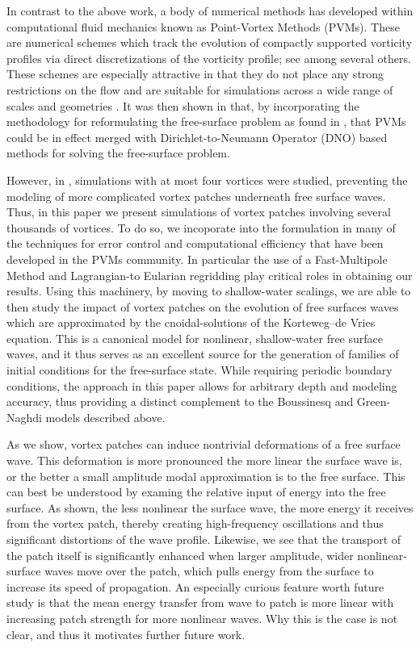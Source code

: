 \documentclass[a4paper,11pt]{article}
\begin{document}
In contrast to the above work, a body of numerical methods has developed within computational fluid mechanics known as Point-Vortex Methods (PVMs).  These are numerical schemes which track the evolution of compactly supported vorticity profiles via direct discretizations of the vorticity profile; see \cite{cottet,koumoutsakos,koumoutsakos2,krasny,beale,majda} among several others.  These schemes are especially attractive in that they do not place any strong restrictions on the flow and are suitable for simulations across a wide range of scales and geometries \cite{koumoutsakos3,koumoutsakos4}.  It was then shown in \cite{curtis} that, by incorporating the methodology for reformulating the free-surface problem as found in \cite{afm}, that PVMs could be in effect merged with Dirichlet-to-Neumann Operator (DNO) based methods \cite{craig,guyenne} for solving the free-surface problem.  

However, in \cite{curtis}, simulations with at most four vortices were studied, preventing the modeling of more complicated vortex patches underneath free surface waves.  Thus, in this paper we present simulations of vortex patches involving several thousands of vortices.  To do so, we incoporate into the formulation in \cite{curtis} many of the techniques for error control and computational efficiency that have been developed in the PVMs community.  In particular the use of a Fast-Multipole Method \cite{greengard} and Lagrangian-to Eularian regridding \cite{koumoutsakos} play critical roles in obtaining our results.  Using this machinery, by moving to shallow-water scalings, we are able to then study the impact of vortex patches on the evolution of free surfaces waves which are approximated by the cnoidal-solutions of the Korteweg--de Vries equation.  This is a canonical model for nonlinear, shallow-water free surface waves, and it thus serves as an excellent source for the generation of families of initial conditions for the free-surface state.  While requiring periodic boundary conditions, the approach in this paper allows for arbitrary depth and modeling accuracy, thus providing a distinct complement to the Boussinesq and Green-Naghdi models described above.

As we show, vortex patches can induce nontrivial deformations of a free surface wave.  This deformation is more pronounced the more linear the surface wave is, or the better a small amplitude modal approximation is to the free surface.  This can best be understood by examing the relative input of energy into the free surface.  As shown, the less nonlinear the surface wave, the more energy it receives from the vortex patch, thereby creating high-frequency oscillations and thus significant distortions of the wave profile.  Likewise, we see that the transport of the patch itself is significantly enhanced when larger amplitude, wider nonlinear-surface waves move over the patch, which pulls energy from the surface to increase its speed of propagation.  An especially curious feature worth future study is that the mean energy transfer from wave to patch is more linear with increasing patch strength for more nonlinear waves.  Why this is the case is not clear, and thus it motivates further future work.  
\end{document}
